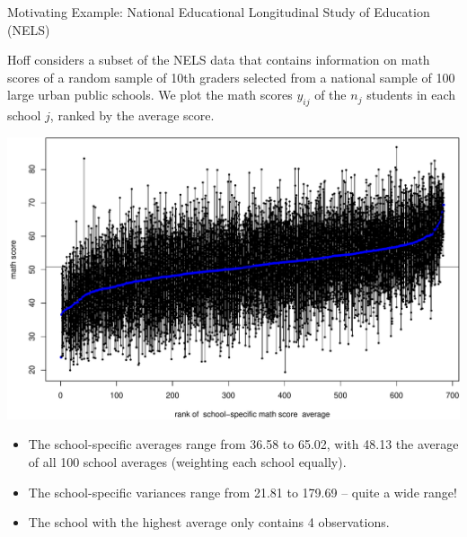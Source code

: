\documentclass[ignorenonframetext,]{beamer}
\begin{document}
\begin{frame}{Motivating Example: National Educational Longitudinal
Study of Education (NELS)}

Hoff considers a subset of the NELS data that contains information on
math scores of a random sample of 10th graders selected from a national
sample of 100 large urban public schools. We plot the math scores
\(y_{ij}\) of the \(n_j\) students in each school \(j\), ranked by the
average score.

\end{frame}

\begin{frame}{}

\includegraphics{ancova_01_deck_files/figure-beamer/nelsplot1-1.pdf}

\end{frame}

\begin{frame}{}

\begin{itemize}
\item
  The school-specific averages range from 36.58 to 65.02, with 48.13 the
  average of all 100 school averages (weighting each school equally).
\item
  The school-specific variances range from 21.81 to 179.69 -- quite a
  wide range!
\item
  The school with the highest average only contains 4 observations.
\end{itemize}

\end{frame}
\end{document}
